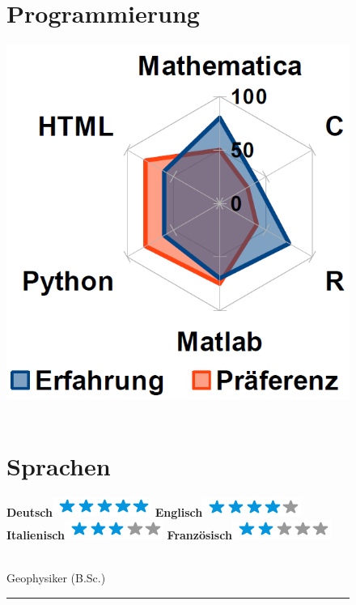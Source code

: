 \documentclass{scrartcl}
\begin{document}
\begin{figure}[htb]
\begin{minipage}[t]{0.25\textwidth}
    \section*{\hfill \color{pblue} Programmierung}
	\vspace{-2mm}
	\includegraphics[scale=0.3]{img/Programming.png}
	~
	\section*{\hfill \color{pblue} Sprachen}
	\vspace{-2mm}
	\textbf{Deutsch}\includegraphics[scale=0.40]{img/5stars.png}
	\textbf{Englisch}\includegraphics[scale=0.40]{img/4stars.png}
    \textbf{Italienisch}\includegraphics[scale=0.67]{img/3stars.png}
    \textbf{Französisch}\includegraphics[scale=0.40]{img/2stars.png}
	\end{minipage}
	\hfill
%	
	\begin{minipage}[t]{0.72\textwidth} 
	{\fontsize{30pt}{62pt}\color{gray} }\\
    {\fontsize{14pt}{24pt}\color{pblue} \selectfont Geophysiker \color{lightgray} (B.Sc.)}\\
	\hrule
	

\end{minipage}
\end{figure}
\end{document}

